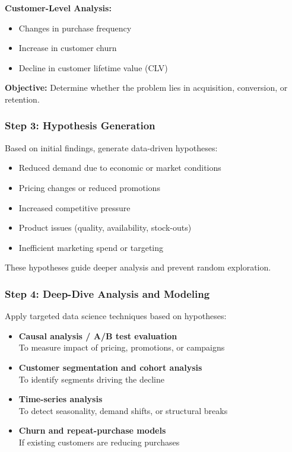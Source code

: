\documentclass[10pt,a4paper]{article}
\begin{document}
	\textbf{Customer-Level Analysis:}
	\begin{itemize}
	    \item Changes in purchase frequency
	    \item Increase in customer churn
	    \item Decline in customer lifetime value (CLV)
	\end{itemize}
	
	\textbf{Objective:} Determine whether the problem lies in acquisition, conversion, or retention.
	
	\subsubsection{Step 3: Hypothesis Generation}
	
	Based on initial findings, generate data-driven hypotheses:
	
	\begin{itemize}
	    \item Reduced demand due to economic or market conditions
	    \item Pricing changes or reduced promotions
	    \item Increased competitive pressure
	    \item Product issues (quality, availability, stock-outs)
	    \item Inefficient marketing spend or targeting
	\end{itemize}
	
	These hypotheses guide deeper analysis and prevent random exploration.
	
	\subsubsection{Step 4: Deep-Dive Analysis and Modeling}
	
	Apply targeted data science techniques based on hypotheses:
	
	\begin{itemize}
	    \item \textbf{Causal analysis / A/B test evaluation} \\
	    To measure impact of pricing, promotions, or campaigns
	
	    \item \textbf{Customer segmentation and cohort analysis} \\
	    To identify segments driving the decline
	
	    \item \textbf{Time-series analysis} \\
	    To detect seasonality, demand shifts, or structural breaks
	
	    \item \textbf{Churn and repeat-purchase models} \\
	    If existing customers are reducing purchases
	\end{itemize}
	
\end{document}
